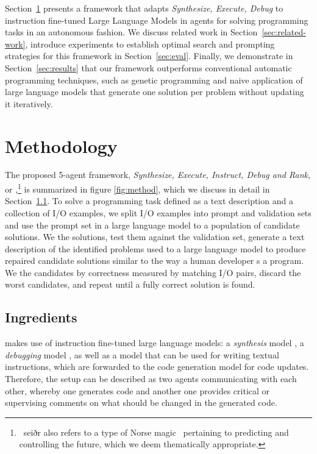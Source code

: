 Section~\ref{sec:seidr-methodology} presents a framework that adapts \emph{Synthesize, Execute, Debug} to instruction fine-tuned Large Language Models in agents for solving programming tasks in an autonomous fashion. 
We discuss related work in Section~\ref{sec:related-work}, introduce experiments to establish optimal search and prompting strategies for this framework in Section~\ref{sec:eval}. 
Finally, we demonstrate in Section~\ref{sec:results} that our framework outperforms conventional automatic programming techniques, such as genetic programming and naive application of large language models that generate one solution per problem without updating it iteratively. 

\newpage \section{Methodology}
\label{sec:seidr-methodology}
The proposed 5-agent framework, \emph{Synthesize, Execute, Instruct, Debug and Rank}, or \method{},\footnote{~seiðr also refers to a type of Norse magic~\cite{blain2002:nine} pertaining to predicting and controlling the future, which we deem thematically appropriate.} is summarized in figure \ref{fig:method}, which we discuss in detail in Section~\ref{sec:ingredients}.
To solve a programming task defined as a text description and a collection of I/O examples, we split I/O examples into prompt and validation sets and use the prompt set in a large language model to \synthesize{} a population of candidate solutions.
We \execute{} the solutions, test them against the validation set, generate a text description of the identified problems used to \instruct{} a large language model to produce repaired candidate solutions similar to the way a human developer \debug{}s a program.
We \rank{} the candidates
by correctness measured by matching I/O pairs, discard the worst candidates, and repeat until a fully correct solution is found.

 

\newpage \subsection{Ingredients}
\label{sec:ingredients}

\method{} makes use of instruction fine-tuned large language models: a \emph{synthesis} model \synthmodel{}, a \emph{debugging} model \debugmodel{}, as well as a model \textmodel{} that can be used for writing textual instructions, which are forwarded to the code generation model \debugmodel{} for code updates. 
Therefore, the setup can be described as two agents communicating with each other, whereby one generates code and another one provides critical or supervising comments on what should be changed in the generated code. 

